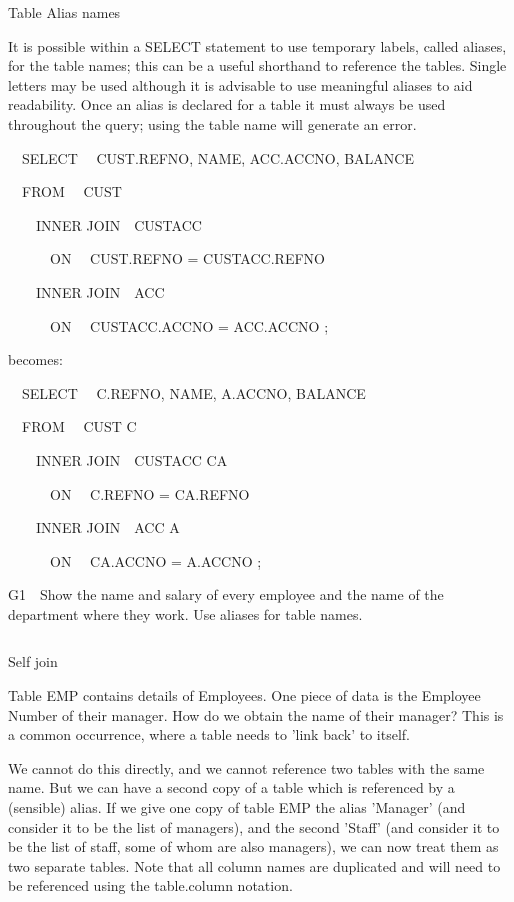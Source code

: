 
Table Alias names

It is possible within a SELECT statement to use temporary labels, called aliases, for the table names; this can be a useful shorthand to reference the tables.  Single letters may be used although it is advisable to use meaningful aliases to aid readability.  Once an alias is declared for a table it must always be used throughout the query; using the table name will generate an error.

\ \ SELECT \ \ CUST.REFNO, NAME, ACC.ACCNO, BALANCE

\ \ FROM \ \ CUST  

\ \ \ \ INNER JOIN\ \ CUSTACC 

\ \ \ \ \ \ ON \ \ CUST.REFNO = CUSTACC.REFNO

\ \ \ \ INNER JOIN\ \ ACC 

\ \ \ \ \ \ ON \ \ CUSTACC.ACCNO = ACC.ACCNO ;

becomes:

\ \ SELECT \ \ C.REFNO, NAME, A.ACCNO, BALANCE

\ \ FROM \ \ CUST  C

\ \ \ \ INNER JOIN\ \ CUSTACC CA 

\ \ \ \ \ \ ON \ \ C.REFNO = CA.REFNO

\ \ \ \ INNER JOIN\ \ ACC A 

\ \ \ \ \ \ ON \ \ CA.ACCNO = A.ACCNO ;

G1\ \ Show the name and salary of every employee and the name of the department where they work. Use aliases for table names.

\begin{flushleft}
\tablefirsthead{}
\tablehead{}
\tabletail{}
\tablelasttail{}
\begin{supertabular}{|m{14.303cm}|}
\hline
\\\hline
\end{supertabular}
\end{flushleft}
Self join

Table EMP contains details of Employees.  One piece of data is the Employee Number of their manager.  How do we obtain the name of their manager?  This is a common occurrence, where a table needs to 'link back' to itself.  

We cannot do this directly, and we cannot reference two tables with the same name.  But we can have a second copy of a table which is referenced by a (sensible) alias.  If we give one copy of table EMP the alias 'Manager' (and consider it to be the list of managers), and the second 'Staff' (and consider it to be the list of staff, some of whom are also managers), we can now treat them as two separate tables.  Note that all column names are duplicated and will need to be referenced using the table.column  notation.

